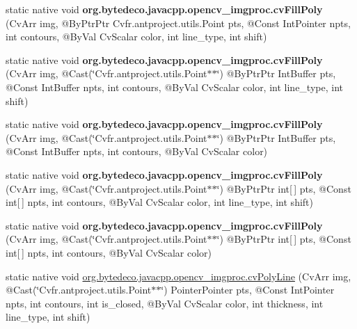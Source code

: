 \begin{DoxyCompactItemize}
\item 
\mbox{\label{group__imgproc__c_gadee8acddd62888753c55f63fe42fcc2b}} 
static native void {\bfseries org.\+bytedeco.\+javacpp.\+opencv\+\_\+imgproc.\+cv\+Fill\+Poly} (Cv\+Arr img, @By\+Ptr\+Ptr Cv\+fr.antproject.utils.Point pts, @Const Int\+Pointer npts, int contours, @By\+Val Cv\+Scalar color, int line\+\_\+type, int shift)
\item 
\mbox{\label{group__imgproc__c_ga5fe951ad5684d864593ad9d1ef989ac1}} 
static native void {\bfseries org.\+bytedeco.\+javacpp.\+opencv\+\_\+imgproc.\+cv\+Fill\+Poly} (Cv\+Arr img, @Cast(\char`\"{}Cv\+fr.antproject.utils.Point$\ast$$\ast$\char`\"{}) @By\+Ptr\+Ptr Int\+Buffer pts, @Const Int\+Buffer npts, int contours, @By\+Val Cv\+Scalar color, int line\+\_\+type, int shift)
\item 
\mbox{\label{group__imgproc__c_ga66ead75868369df12307a66c7b34ea15}} 
static native void {\bfseries org.\+bytedeco.\+javacpp.\+opencv\+\_\+imgproc.\+cv\+Fill\+Poly} (Cv\+Arr img, @Cast(\char`\"{}Cv\+fr.antproject.utils.Point$\ast$$\ast$\char`\"{}) @By\+Ptr\+Ptr Int\+Buffer pts, @Const Int\+Buffer npts, int contours, @By\+Val Cv\+Scalar color)
\item 
\mbox{\label{group__imgproc__c_gaa66b7f31ebac8656b766701a2df34853}} 
static native void {\bfseries org.\+bytedeco.\+javacpp.\+opencv\+\_\+imgproc.\+cv\+Fill\+Poly} (Cv\+Arr img, @Cast(\char`\"{}Cv\+fr.antproject.utils.Point$\ast$$\ast$\char`\"{}) @By\+Ptr\+Ptr int\mbox{[}$\,$\mbox{]} pts, @Const int\mbox{[}$\,$\mbox{]} npts, int contours, @By\+Val Cv\+Scalar color, int line\+\_\+type, int shift)
\item 
\mbox{\label{group__imgproc__c_ga43743e699a41e13a20bba81acaf8579b}} 
static native void {\bfseries org.\+bytedeco.\+javacpp.\+opencv\+\_\+imgproc.\+cv\+Fill\+Poly} (Cv\+Arr img, @Cast(\char`\"{}Cv\+fr.antproject.utils.Point$\ast$$\ast$\char`\"{}) @By\+Ptr\+Ptr int\mbox{[}$\,$\mbox{]} pts, @Const int\mbox{[}$\,$\mbox{]} npts, int contours, @By\+Val Cv\+Scalar color)
\item 
static native void \hyperlink{group__imgproc__c_ga6e673e2e62b461c739fd8ac6fef9d226}{org.\+bytedeco.\+javacpp.\+opencv\+\_\+imgproc.\+cv\+Poly\+Line} (Cv\+Arr img, @Cast(\char`\"{}Cv\+fr.antproject.utils.Point$\ast$$\ast$\char`\"{}) Pointer\+Pointer pts, @Const Int\+Pointer npts, int contours, int is\+\_\+closed, @By\+Val Cv\+Scalar color, int thickness, int line\+\_\+type, int shift)
$$
\end{DoxyCompactItemize}
